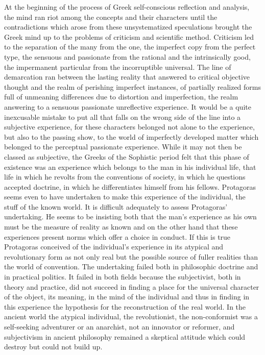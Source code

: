 \documentclass[12pt]{article}
\begin{document}
At the beginning of the process of Greek self-conscious
reflection and analysis, the mind ran riot among
the concepts and their characters until the contradictions
which arose from these unsystematized speculations
brought the Greek mind up to the problems of
criticism and scientific method. Criticism led to the
separation of the many from the one, the imperfect copy
from the perfect type, the sensuous and passionate from
the rational and the intrinsically good, the impermanent
particular from the incorruptible universal. The line
of demarcation ran between the lasting reality that
answered to critical objective thought and the realm
of perishing imperfect instances, of partially realized
forms full of unmeaning differences due to distortion
and imperfection, the realm answering to a sensuous
passionate unreflective experience. It would be a quite
inexcusable mistake to put all that falls on the wrong
side of the line into a subjective experience, for these
characters belonged not alone to the experience, but also
to the passing show, to the world of imperfectly developed
matter which belonged to the perceptual passionate
experience. While it may not then be classed
as subjective, the Greeks of the Sophistic period felt
that this phase of existence was an experience which
belongs to the man in his individual life, that life in
which he revolts from the conventions of society, in
which he questions accepted doctrine, in which he differentiates
himself from his fellows. Protagoras seems
even to have undertaken to make this experience of the
individual, the stuff of the known world. It is difficult
adequately to assess Protagoras' undertaking. He
seems to be insisting both that the man's experience as
his own must be the measure of reality as known and
on the other hand that these experiences present norms
which offer a choice in conduct. If this is true Protagoras
conceived of the individual's experience in its
atypical and revolutionary form as not only real but
the possible source of fuller realities than the world
of convention. The undertaking failed both in philosophic
doctrine and in practical politics. It failed
in both fields because the subjectivist, both in theory
and practice, did not succeed in finding a place
for the universal character of the object, its meaning,
in the mind of the individual and thus in finding
in this experience the hypothesis for the reconstruction
of the real world. In the ancient world the
atypical individual, the revolutionist, the non-conformist
was a self-seeking adventurer or an anarchist, not
an innovator or reformer, and subjectivism in ancient
philosophy remained a skeptical attitude which could
destroy but could not build up.
\end{document}
